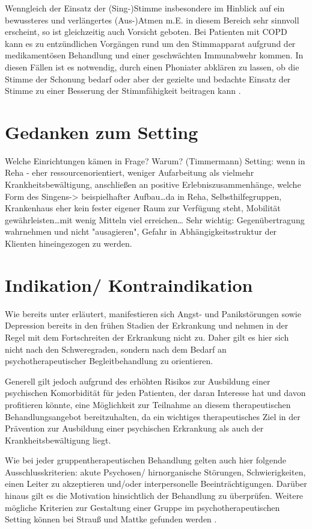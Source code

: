 Wenngleich der Einsatz der (Sing-)Stimme insbesondere im Hinblick auf ein bewussteres und verlängertes (Aus-)Atmen m.E. in diesem Bereich sehr sinnvoll erscheint, so ist gleichzeitig auch Vorsicht geboten. Bei Patienten mit COPD kann es zu entzündlichen Vorgängen rund um den Stimmapparat aufgrund der medikamentösen Behandlung und einer geschwächten Immunabwehr kommen. In diesen Fällen ist es notwendig, durch einen Phoniater abklären zu lassen, ob die Stimme der Schonung bedarf oder aber der gezielte und bedachte Einsatz der Stimme zu einer Besserung der Stimmfähigkeit beitragen kann \autocite[vgl.][103ff.]{alavi2009}.

\section{Gedanken zum Setting}
\label{section:gedanken_zum_setting}
Welche Einrichtungen kämen in Frage? Warum? 
(Timmermann) Setting: wenn in Reha - eher ressourcenorientiert, weniger Aufarbeitung als vielmehr Krankheitsbewältigung, anschließen an positive Erlebniszusammenhänge, welche Form des Singens-> beispielhafter Aufbau\ldots da in Reha, Selbsthilfegruppen, Krankenhaus eher kein fester eigener Raum zur Verfügung steht, Mobilität gewährleisten\ldots mit wenig Mitteln viel erreichen…
Sehr wichtig: Gegenübertragung wahrnehmen und nicht "ausagieren", Gefahr in Abhängigkeitsstruktur der Klienten hineingezogen zu werden.

\section{Indikation/ Kontraindikation}
Wie bereits unter \label{psychische_komorbiditaet} erläutert, manifestieren sich Angst- und Panikstörungen sowie Depression bereits in den frühen Stadien der Erkrankung und nehmen in der Regel mit dem Fortschreiten der Erkrankung nicht zu. Daher gilt es hier sich nicht nach den Schweregraden, sondern nach dem Bedarf an psychotherapeutischer Begleitbehandlung zu orientieren. 

Generell gilt jedoch aufgrund des erhöhten Risikos zur Ausbildung einer psychischen Komorbidität für jeden Patienten, der daran Interesse hat und davon profitieren könnte, eine Möglichkeit zur Teilnahme an diesem therapeutischen Behandlungsangebot bereitzuhalten, da ein wichtiges therapeutisches Ziel in der Prävention zur Ausbildung einer psychischen Erkrankung als auch der Krankheitsbewältigung liegt.

Wie bei jeder gruppentherapeutischen Behandlung gelten auch hier folgende Ausschlusskriterien: akute Psychosen/ hirnorganische Störungen, Schwierigkeiten, einen Leiter zu akzeptieren und/oder interpersonelle Beeinträchtigungen. Darüber hinaus gilt es die Motivation hinsichtlich der Behandlung zu überprüfen. Weitere mögliche Kriterien zur Gestaltung einer Gruppe im psychotherapeutischen Setting können bei Strauß und Mattke gefunden werden \autocite[vgl.][78-88]{mattke2007}.

